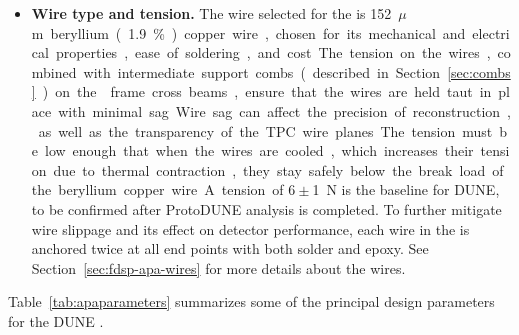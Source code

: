\begin{itemize}
\item \textbf{Wire type and tension.}  The wire selected for the  is \SI{152}{$\mu$m} beryllium (\num{1.9}\%) copper wire, %
chosen for its mechanical and electrical properties, ease of soldering, and cost.  The tension on the wires, combined with intermediate support combs (described in Section~\ref{sec:combs}) on the  frame cross beams, ensure that the wires are held taut in place with minimal sag.  Wire sag can affect the precision of reconstruction, as well as the transparency of the TPC wire planes.  The tension must be low enough that when the wires are cooled, which increases their tension due to thermal contraction, they stay safely below the break load of the beryllium copper wire.  A tension of $6\pm$\SI{1}{N} is the baseline for DUNE, to be confirmed after ProtoDUNE analysis is completed.  To further mitigate wire slippage and its effect on detector performance, each wire in the  is anchored twice at all end points with both solder and epoxy.  See Section~\ref{sec:fdsp-apa-wires} for more details about the wires.

\end{itemize}

Table~\ref{tab:apaparameters} summarizes some of the principal design parameters for the DUNE 
.

